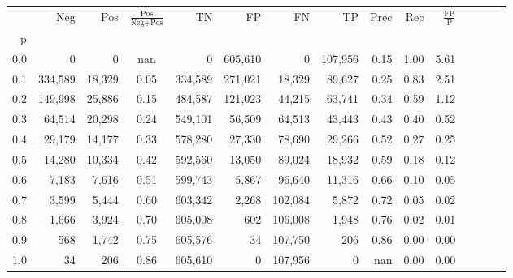 \begin{tabular}{rrrcrrrrrrrrrrr}
\toprule
{} &      Neg &     Pos & $\frac{\text{Pos}}{\text{Neg}+\text{Pos}}$ &       TN &       FP &       FN &       TP &  Prec &   Rec & $\frac{\text{FP}}{\text{P}}$ \\
p   &          &         &                                            &          &          &          &          &       &       &                              \\
\midrule
0.0 &        0 &       0 &                                        nan &        0 &  605,610 &        0 &  107,956 &  0.15 &  1.00 &                         5.61 \\
0.1 &  334,589 &  18,329 &                                       0.05 &  334,589 &  271,021 &   18,329 &   89,627 &  0.25 &  0.83 &                         2.51 \\
0.2 &  149,998 &  25,886 &                                       0.15 &  484,587 &  121,023 &   44,215 &   63,741 &  0.34 &  0.59 &                         1.12 \\
0.3 &   64,514 &  20,298 &                                       0.24 &  549,101 &   56,509 &   64,513 &   43,443 &  0.43 &  0.40 &                         0.52 \\
0.4 &   29,179 &  14,177 &                                       0.33 &  578,280 &   27,330 &   78,690 &   29,266 &  0.52 &  0.27 &                         0.25 \\
0.5 &   14,280 &  10,334 &                                       0.42 &  592,560 &   13,050 &   89,024 &   18,932 &  0.59 &  0.18 &                         0.12 \\
0.6 &    7,183 &   7,616 &                                       0.51 &  599,743 &    5,867 &   96,640 &   11,316 &  0.66 &  0.10 &                         0.05 \\
0.7 &    3,599 &   5,444 &                                       0.60 &  603,342 &    2,268 &  102,084 &    5,872 &  0.72 &  0.05 &                         0.02 \\
0.8 &    1,666 &   3,924 &                                       0.70 &  605,008 &      602 &  106,008 &    1,948 &  0.76 &  0.02 &                         0.01 \\
0.9 &      568 &   1,742 &                                       0.75 &  605,576 &       34 &  107,750 &      206 &  0.86 &  0.00 &                         0.00 \\
1.0 &       34 &     206 &                                       0.86 &  605,610 &        0 &  107,956 &        0 &   nan &  0.00 &                         0.00 \\
\bottomrule
\end{tabular}
